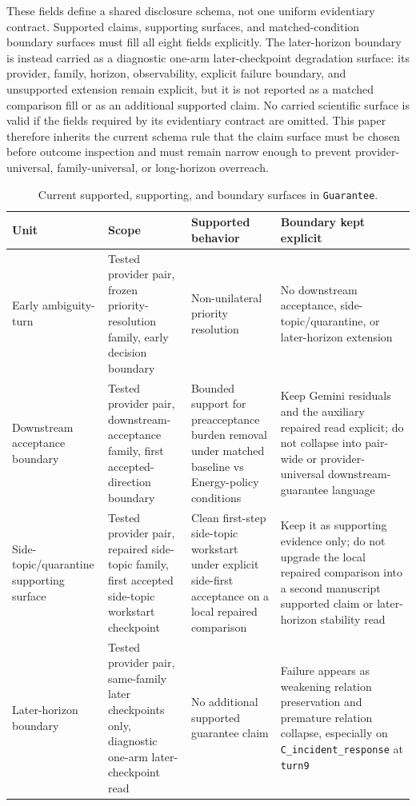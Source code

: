 \documentclass[11pt]{article}
\begin{document}
These fields define a shared disclosure schema, not one uniform evidentiary
contract. Supported claims, supporting surfaces, and matched-condition boundary
surfaces must fill all eight fields explicitly. The later-horizon boundary is
instead carried as a diagnostic one-arm later-checkpoint degradation surface:
its provider, family, horizon, observability, explicit failure boundary, and
unsupported extension remain explicit, but it is not reported as a matched
comparison fill or as an additional supported claim. No carried scientific
surface is valid if the fields required by its evidentiary contract are
omitted. This paper therefore inherits the current schema rule that the claim
surface must be chosen before outcome inspection and must remain narrow enough
to prevent provider-universal, family-universal, or long-horizon overreach.

\begin{table}[ht]
\centering
\begin{tabular}{|p{}|p{}|p{}|p{}|}
\hline
\textbf{Unit} & \textbf{Scope} & \textbf{Supported behavior} & \textbf{Boundary kept explicit} \\
\hline
Early ambiguity-turn & Tested provider pair, frozen priority-resolution family, early decision boundary & Non-unilateral priority resolution & No downstream acceptance, side-topic/quarantine, or later-horizon extension \\
\hline
Downstream acceptance boundary & Tested provider pair, downstream-acceptance family, first accepted-direction boundary & Bounded support for preacceptance burden removal under matched baseline vs Energy-policy conditions & Keep Gemini residuals and the auxiliary repaired read explicit; do not collapse into pair-wide or provider-universal downstream-guarantee language \\
\hline
Side-topic/quarantine supporting surface & Tested provider pair, repaired side-topic family, first accepted side-topic workstart checkpoint & Clean first-step side-topic workstart under explicit side-first acceptance on a local repaired comparison & Keep it as supporting evidence only; do not upgrade the local repaired comparison into a second manuscript supported claim or later-horizon stability read \\
\hline
Later-horizon boundary & Tested provider pair, same-family later checkpoints only, diagnostic one-arm later-checkpoint read & No additional supported guarantee claim & Failure appears as weakening relation preservation and premature relation collapse, especially on \texttt{C\_incident\_response} at \texttt{turn9} \\
\hline
\end{tabular}
\caption{Current supported, supporting, and boundary surfaces in
\texttt{Guarantee}.}
\end{table}
\end{document}
